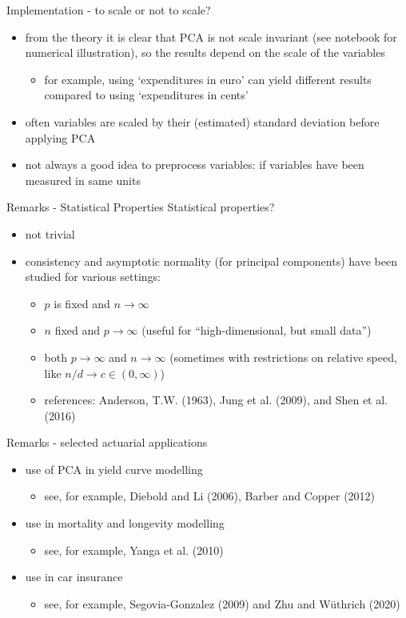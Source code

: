 \documentclass[pdf, handout]{beamer}
\begin{document}
\begin{frame}{Implementation - to scale or not to scale?}
\begin{itemize}
\item from the theory it is clear that PCA is not scale invariant (see notebook for numerical illustration), so the results depend on the scale of the variables
\begin{itemize}
\item for example, using `expenditures in euro' can yield different results
compared to using `expenditures in cents'
\end{itemize}
\item often variables are scaled by their (estimated) standard deviation before
applying PCA
\item not always a good idea to preprocess variables: 
if variables have been measured in same units
\end{itemize}
\end{frame}
%
\begin{frame}{Remarks - Statistical Properties}
Statistical properties?
\begin{itemize}
\item not trivial
\item consistency and asymptotic normality (for principal components) have been studied for various settings:
\begin{itemize}
\item $p$ is fixed and $n\to\infty$ 
\item $n$ fixed and $p\to\infty$ (useful for ``high-dimensional, but small data'')
\item both $p\to\infty$
and $n\to\infty$ (sometimes with restrictions on relative speed, like $n/d\to c\in(0,\infty)$) 
\item references:  Anderson, T.W. (1963), Jung et al. (2009), and
Shen et al. (2016)
\end{itemize}
\end{itemize}
\end{frame}


\begin{frame}{Remarks - selected actuarial applications}
\begin{itemize}
\item use of PCA in yield curve modelling
\begin{itemize}
\item see, for example, Diebold and Li (2006), Barber and Copper (2012)
\end{itemize}
\item use in mortality and longevity modelling
\begin{itemize}
\item see, for example, Yanga et al. (2010)
\end{itemize}
\item use in car insurance
\begin{itemize}
\item see, for example, Segovia-Gonzalez (2009) and
Zhu and W\"{u}thrich (2020)
\end{itemize}
\end{itemize}
\end{frame}
\end{document}
